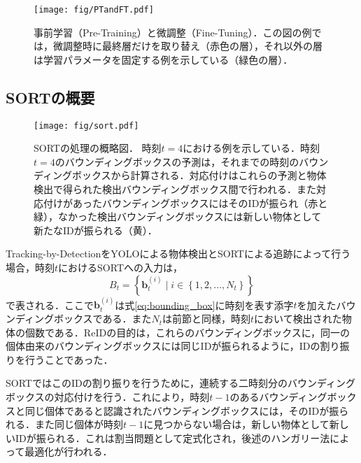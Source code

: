         \begin{figure}[t]
            \centering    
            \texttt{[image: fig/PTandFT.pdf]}
            \caption[事前学習（Pre-Training）と微調整（Fine-Tuning）]{事前学習（Pre-Training）と微調整（Fine-Tuning）．この図の例では，微調整時に最終層だけを取り替え（赤色の層），それ以外の層は学習パラメータを固定する例を示している（緑色の層）．}
            \label{fig:PTandFT}
        \end{figure}

    \subsection{SORTの概要}
    \label{subsec:abstract_of_sort}

    \begin{figure}[t]
        \centering
        \texttt{[image: fig/sort.pdf]}
        \caption[SORTの処理の概略図]{SORTの処理の概略図．
        時刻$t=4$における例を示している．時刻$t=4$のバウンディングボックスの予測は，それまでの時刻のバウンディングボックスから計算される．対応付けはこれらの予測と物体検出で得られた検出バウンディングボックス間で行われる．また対応付けがあったバウンディングボックスにはそのIDが振られ（赤と緑），なかった検出バウンディングボックスには新しい物体として新たなIDが振られる（黄）．}
        \label{fig:sort}
    \end{figure}

    Tracking-by-DetectionをYOLOによる物体検出とSORTによる追跡によって行う場合，時刻$t$におけるSORTへの入力は，
    \begin{equation}
        \label{eq:input_to_sort}
        B_t = \left\{\bm{b}_t^{(i)} \mid i \in \left\{1 ,2, \dots, N_t\right\}\right\}
    \end{equation}
    で表される．ここで$\bm{b}_t^{(i)}$は式\ref{eq:bounding_box}に時刻を表す添字$t$を加えたバウンディングボックスである．また$N_t$は前節と同様，時刻$t$において検出された物体の個数である．ReIDの目的は，これらのバウンディングボックスに，同一の個体由来のバウンディングボックスには同じIDが振られるように，IDの割り振りを行うことであった．

    SORTではこのIDの割り振りを行うために，連続する二時刻分のバウンディングボックスの対応付けを行う．これにより，時刻$t-1$のあるバウンディングボックスと同じ個体であると認識されたバウンディングボックスには，そのIDが振られる．また同じ個体が時刻$t-1$に見つからない場合は，新しい物体として新しいIDが振られる．これは割当問題として定式化され，後述のハンガリー法によって最適化が行われる．

